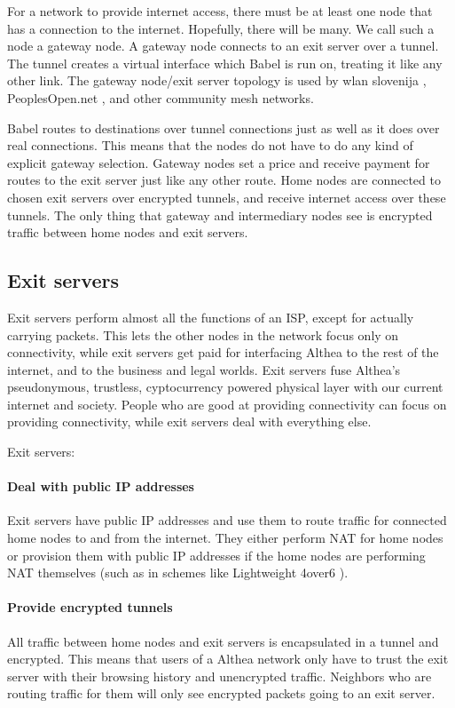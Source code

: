 \documentclass[11pt]{article}
\begin{document}
For a network to provide internet access, there must be at least one node that has a connection to the internet. Hopefully, there will be many. We call such a node a gateway node. A gateway node connects to an exit server over a tunnel. The tunnel creates a virtual interface which Babel is run on, treating it like any other link. The gateway node/exit server topology \cite{exittopology} is used by wlan slovenija \cite{wlanslovenija}, PeoplesOpen.net \cite{pplsopen}, and other community mesh networks.

Babel routes to destinations over tunnel connections just as well as it does over real connections. This means that the nodes do not have to do any kind of explicit gateway selection. Gateway nodes set a price and receive payment for routes to the exit server just like any other route. Home nodes are connected to chosen exit servers over encrypted tunnels, and receive internet access over these tunnels. The only thing that gateway and intermediary nodes see is encrypted traffic between home nodes and exit servers.

\subsection{Exit servers}
Exit servers perform almost all the functions of an ISP, except for actually carrying packets. This lets the other nodes in the network focus only on connectivity, while exit servers get paid for interfacing Althea to the rest of the internet, and to the business and legal worlds. Exit servers fuse Althea’s pseudonymous, trustless, cyptocurrency powered physical layer with our current internet and society. People who are good at providing connectivity can focus on providing connectivity, while exit servers deal with everything else. 

Exit servers:

\paragraph{Deal with public IP addresses}
Exit servers have public IP addresses and use them to route traffic for connected home nodes to and from the internet. They either perform NAT for home nodes or provision them with public IP addresses if the home nodes are performing NAT themselves (such as in schemes like Lightweight 4over6 \cite{4over6}). 

\paragraph{Provide encrypted tunnels}
All traffic between home nodes and exit servers is encapsulated in a tunnel and encrypted. This means that users of a Althea network only have to trust the exit server with their browsing history and unencrypted traffic. Neighbors who are routing traffic for them will only see encrypted packets going to an exit server.
\end{document}
